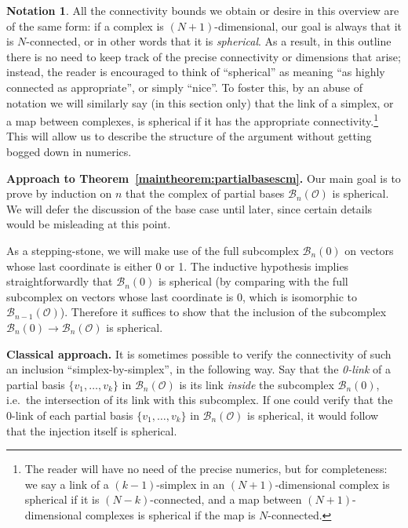 \documentclass[11 pt]{article}
\theoremstyle{plain}
\theoremstyle{definition}
\newtheorem*{notation}{Notation}
\numberwithin{equation}{section}
\newcommand{\para}[1]{\bigskip\noindent\textbf{#1.}}
\renewcommand{\O}{\mathcal{O}}
\newcommand\PartialBases{\ensuremath{\mathcal{B}}}
\newcommand{\PB}{\PartialBases}
\begin{document}
\begin{notation}All the connectivity bounds we obtain or desire in this overview are of the same form: if a complex is $(N+1)$-dimensional, our goal is always that it is $N$-connected, or in other words that it is \emph{spherical}. As a result, in this outline there is no need to keep track of the precise connectivity or dimensions that arise; instead, the reader is encouraged to think of ``spherical'' as meaning ``as highly connected as appropriate'', or simply ``nice''. To foster this, by an abuse of notation we will similarly say (in this section only) that the link of a simplex, or a map between complexes, is spherical if it has the appropriate connectivity.\footnote{The reader will have no need of the precise numerics, but for completeness: we say a link of a $(k-1)$-simplex in an $(N+1)$-dimensional complex is spherical if it is $(N-k)$-connected, and a map between $(N+1)$-dimensional complexes is spherical if the map is $N$-connected.} This will allow us to describe the structure of the argument without getting bogged down in numerics.
\end{notation}

\para{Approach to Theorem~\ref{maintheorem:partialbasescm}}
Our main goal is to prove by induction on $n$ that the complex of partial bases $\PB_n(\O)$ is spherical. We will defer the discussion of the base case until later, since certain details would be misleading at this point.


As a stepping-stone, we will make use of the full subcomplex $\PB_n(0)$ on vectors whose last coordinate is either 0 or 1.
The inductive hypothesis implies straightforwardly that $\PB_n(0)$ is spherical (by comparing with the full subcomplex on vectors whose last coordinate is 0, which is isomorphic to $\PB_{n-1}(\O)$). Therefore it suffices to show that the inclusion of the subcomplex $\PB_n(0)\to \PB_n(\O)$ is spherical.

\para{Classical approach}
It is sometimes possible to verify the connectivity of such an inclusion ``simplex-by-simplex'', in the following way. Say that the \emph{0-link} of a partial basis $\{v_1,\ldots,v_k\}$
in $\PB_n(\O)$ is its link \emph{inside} the subcomplex $\PB_n(0)$, i.e.\ the intersection of its link with this subcomplex. If one could verify that the 0-link of each partial basis $\{v_1,\ldots,v_k\}$
in $\PB_n(\O)$  is %
spherical, it would follow that the injection itself is spherical. %
\end{document}
